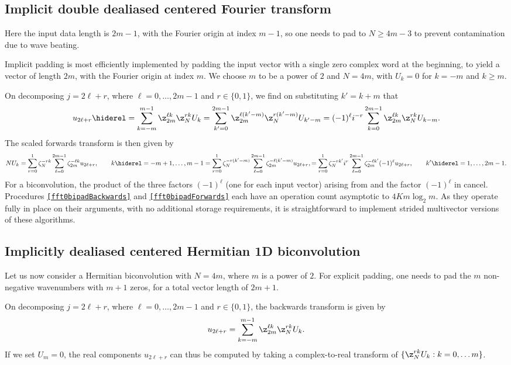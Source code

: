 \documentclass[final]{siamltex}
\def\ee{\end{dmath*}}
\def\bel{\begin{dmath}}
\def\eel{\end{dmath}}
\def\bec{\begin{dmath*}[compact]}
\let\eec\ee
\def\no{\hiderel}
\begin{document}
\subsection{Implicit double dealiased centered Fourier transform}
\label{fft0bi}
Here the input data length is $2m-1$, with the Fourier origin at index
$m-1$, so one needs to pad to $N\ge 4m-3$ to prevent contamination due to
wave beating.

Implicit padding is most efficiently implemented by padding the input
vector with a single zero complex word at the beginning, to yield a vector
of length $2m$, with the Fourier origin at index $m$. We choose $m$ to be
a power of $2$ and $N=4m$, with $U_k=0$ for $k=-m$ and $k\ge m$. 

On decomposing $j=2\ell+r$, where $\ell=0,\ldots, 2m-1$ and $r\in\{0,1\}$,
we find on substituting $k'=k+m$ that
\bel
u_{2\ell +r}\no=\sum_{k=-m}^{m-1}\z_{2m}^{\ell k} \z_N^{rk} U_k
=\sum_{k'=0}^{2m-1}\z_{2m}^{\ell (k'-m)} \z_N^{r(k'-m)} U_{k'-m}
=(-1)^\ell i^{-r}\sum_{k=0}^{2m-1}\z_{2m}^{\ell k} \z_N^{rk} U_{k-m}.
\label{fft0bibackwards}
\eel
The scaled forwards transform is then given by
\bel
NU_k=\sum_{r=0}^{1}\zeta_N^{-rk}\sum_{\ell=0}^{2m-1}\zeta_{2m}^{-\ell k} u_{2\ell+r},
\qquad k\no =-m+1,\ldots,m-1
=\sum_{r=0}^{1}\zeta_N^{-r(k'-m)}\sum_{\ell=0}^{2m-1}\zeta_{2m}^{-\ell (k'-m)} u_{2\ell+r},
=\sum_{r=0}^{1}\zeta_N^{-rk'}i^r\sum_{\ell=0}^{2m-1}\zeta_{2m}^{-\ell k'}(-1)^\ell u_{2\ell+r},
\qquad k'\no =1,\ldots,2m-1.\label{fft0biforwards}
\eel
For a biconvolution, the product of the three factors $(-1)^\ell$
(one for each input vector) arising from 
and the factor $(-1)^\ell$ in  cancel.
Procedures {\tt\ref{fft0bipadBackwards}} and {\tt\ref{fft0bipadForwards}}
each have an operation count asymptotic to $4Km\log_2 m$. As they
operate fully in place on their arguments, with no additional storage
requirements, it is straightforward to implement strided multivector
versions of these algorithms.

\subsection{Implicitly dealiased centered Hermitian 1D biconvolution}
Let us now consider a Hermitian biconvolution with $N=4m$, where $m$ is a
power of $2$. For explicit padding, one needs to pad the $m$ non-negative
wavenumbers with $m+1$ zeros, for a total vector length of $2m+1$.

On decomposing $j=2\ell+r$, where
$\ell=0,\ldots, 2m-1$ and $r\in\{0,1\}$, the backwards transform is given
by
\bec
u_{2\ell +r}=\sum_{k=-m}^{m-1} \z_{2m}^{\ell k} \z_N^{rk} U_k.
\eec
If we set $U_m=0$, the real components $u_{2\ell +r}$ can thus be computed
by taking a complex-to-real transform of
$\{\z_N^{rk} U_k : k=0,\ldots m\}$.
\end{document}
